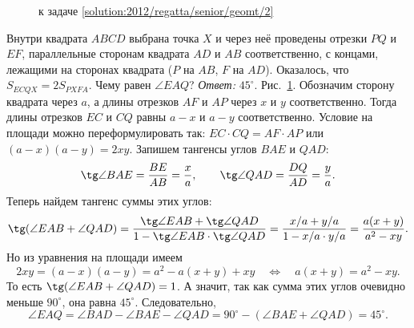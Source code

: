 \ifsolution
\begin{figure}\centering
    \caption{к задаче \ref{solution:2012/regatta/senior/geomt/2}}
    \label{fig:solution:2012/regatta/senior/geomt/2}
\end{figure}
\fi %

\problem
Внутри квадрата $ABCD$ выбрана точка $X$ и через неё проведены отрезки
$PQ$ и $EF$, параллельные сторонам квадрата $AD$ и $AB$ соответственно,
с концами, лежащими на сторонах квадрата ($P$ на $AB$, $F$ на $AD$).
Оказалось, что $S_{ECQX} = 2 S_{PXFA}$.
Чему равен $\angle EAQ$?
\solution
\label{solution:2012/regatta/senior/geomt/2}%
\emph{Ответ:} $45^\circ$.
Рис.~\ref{fig:solution:2012/regatta/senior/geomt/2}.
Обозначим сторону квадрата через $a$, а длины отрезков $AF$ и $AP$ через
$x$ и $y$ соответственно.
Тогда длины отрезков $EC$ и $CQ$ равны $a - x$ и $a - y$ соответственно.
Условие на площади можно переформулировать так:
$EC \cdot CQ = AF \cdot AP$ или $(a - x) (a - y) = 2 x y$.
Запишем тангенсы углов $BAE$ и $QAD$:
\[
    \tg \angle BAE = \dfrac{BE}{AB} = \dfrac{x}{a}
,\qquad
    \tg \angle QAD = \dfrac{DQ}{AD} = \dfrac{y}{a}
.\]
Теперь найдем тангенс суммы этих углов:
\[
    \tg (\angle EAB + \angle QAD)
=
    \dfrac{
        \tg \angle EAB + \tg \angle QAD
    }{
        1 - \tg \angle EAB \cdot \tg \angle QAD
    }
=
    \dfrac{x / a + y / a}{1 - x / a \cdot y / a}
=
    \dfrac{a(x + y)}{a^2 - xy}
.\]
Но из уравнения на площади имеем
\[
    2 x y = (a - x) (a - y) = a^2 - a(x + y) + xy
\quad\Leftrightarrow\quad
    a (x + y) = a^2 - x y
.\]
То есть $\tg (\angle EAB + \angle QAD) = 1$.
А значит, так как сумма этих углов очевидно меньше $90^\circ$,
она равна $45^\circ$.
Следовательно,
\[
    \angle EAQ = \angle BAD - \angle BAE - \angle QAD
=
    90^\circ - (\angle BAE + \angle QAD) = 45^\circ
.\]
\endproblem

